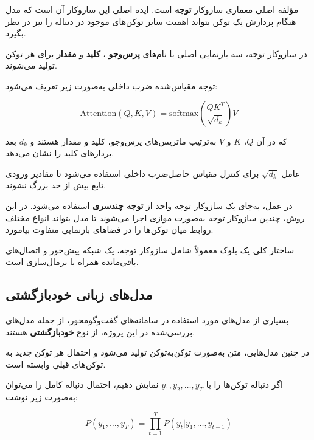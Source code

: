 مؤلفه اصلی معماری  سازوکار
\textbf{توجه}
است.
ایده اصلی این سازوکار آن است که مدل هنگام پردازش یک توکن بتواند
اهمیت سایر توکن‌های موجود در دنباله را نیز در نظر بگیرد.

در سازوکار توجه، سه بازنمایی اصلی با نام‌های
\textbf{پرس‌وجو}
،
\textbf{کلید}
و
\textbf{مقدار}
برای هر توکن تولید می‌شوند.

توجه مقیاس‌شده ضرب داخلی
به‌صورت زیر تعریف می‌شود:

\begin{equation}
\mathrm{Attention}(Q,K,V)
=
\mathrm{softmax}
\left(
\frac{QK^T}{\sqrt{d_k}}
\right)V
\end{equation}

که در آن $Q$، $K$ و $V$ به‌ترتیب ماتریس‌های پرس‌وجو،
کلید و مقدار هستند و $d_k$ بعد بردارهای کلید را نشان می‌دهد.

عامل $\sqrt{d_k}$ برای کنترل مقیاس حاصل‌ضرب داخلی استفاده
می‌شود تا مقادیر ورودی تابع  بیش از حد بزرگ نشوند.

در عمل، به‌جای یک سازوکار توجه واحد از
\textbf{توجه چندسری}
استفاده می‌شود.
در این روش، چندین سازوکار توجه به‌صورت موازی اجرا می‌شوند تا
مدل بتواند انواع مختلف روابط میان توکن‌ها را در فضاهای بازنمایی
متفاوت بیاموزد.

ساختار کلی یک بلوک  معمولاً شامل سازوکار توجه،
یک شبکه پیش‌خور
و اتصال‌های باقی‌مانده
همراه با نرمال‌سازی است.


\subsection{مدل‌های زبانی خودبازگشتی}

بسیاری از مدل‌های مورد استفاده در سامانه‌های گفت‌وگومحور،
از جمله مدل‌های بررسی‌شده در این پروژه، از نوع
\textbf{خودبازگشتی}
هستند.

در چنین مدل‌هایی، متن به‌صورت توکن‌به‌توکن تولید می‌شود و
احتمال هر توکن جدید به توکن‌های قبلی وابسته است.

اگر دنباله توکن‌ها را با
$y_1,y_2,\ldots,y_T$
نمایش دهیم، احتمال دنباله کامل را می‌توان به‌صورت زیر نوشت:

\begin{equation}
P(y_1,\ldots,y_T)
=
\prod_{t=1}^{T}
P(y_t|y_1,\ldots,y_{t-1})
\end{equation}

